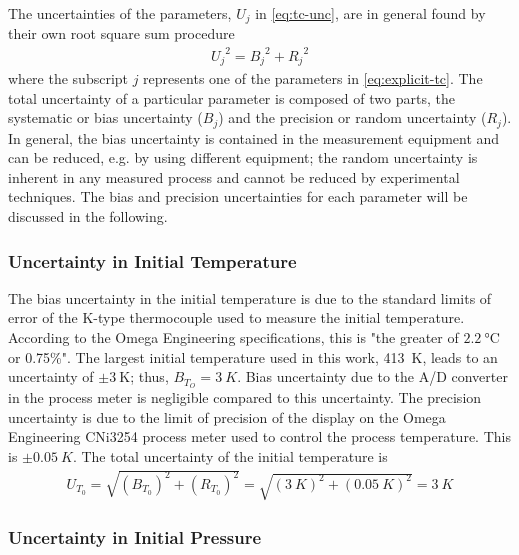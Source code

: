 \documentclass[12pt, letterpaper]{article}
\begin{document}
The uncertainties of the parameters, $U_j$ in \autoref{eq:tc-unc}, are in
general found by their own root square sum procedure
%
\begin{align}
{U_j}^2 = {B_j}^2 + {R_j}^2
\end{align}
%
where the subscript $j$ represents one of the parameters in \autoref{eq:explicit-tc}.
The total uncertainty of a particular parameter is composed of
two parts, the systematic or bias uncertainty ($B_j$) and the
precision or random uncertainty ($R_j$). In general, the bias
uncertainty is contained in the measurement equipment and can
be reduced, e.g. by using different equipment; the random uncertainty
is inherent in any measured process and cannot be reduced by
experimental techniques. The bias and precision uncertainties
for each parameter will be discussed in the following.

\subsubsection{Uncertainty in Initial Temperature}

The bias uncertainty in the initial temperature is due to the standard
limits of error of the K-type thermocouple used to measure the
initial temperature. According to the Omega Engineering
specifications, this is "the greater
of $\SI{2.2}{\degreeCelsius}$ or 0.75\%". The largest initial temperature
used in this work, \SI{413}{K}, leads to an uncertainty of
$\pm \SI{3}{\kelvin}$; thus, $B_{T_O}=\SI{3}{K}$. Bias uncertainty
due to the A/D converter in the process meter is negligible compared
to this uncertainty.
The precision uncertainty is due to the limit of precision of
the display on the Omega Engineering CNi3254 process meter used
to control the process temperature. This is $\pm\SI{0.05}{K}$.
The total uncertainty of the initial temperature is
%
\begin{align}
U_{T_0} = \sqrt{\left(B_{T_0}\right)^2 + \left(R_{T_0}\right)^2} = \sqrt{\left(\SI{3}{K}\right)^2 + \left(\SI{0.05}{K}\right)^2} = \SI{3}{K}
\end{align}

\subsubsection{Uncertainty in Initial Pressure}
\label{sec:unc-p0}
\end{document}
